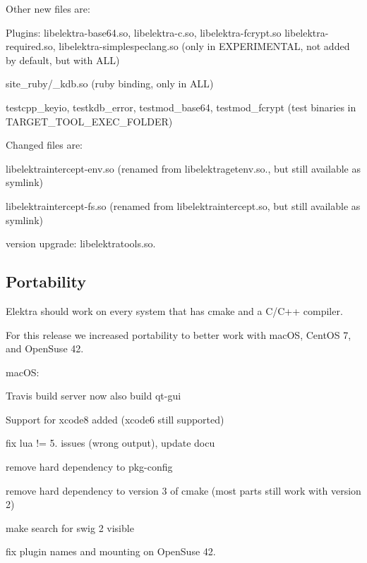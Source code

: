 Other new files are\+:


\begin{DoxyItemize}
\item Plugins\+: {\ttfamily libelektra-\/base64.\+so}, {\ttfamily libelektra-\/c.\+so}, {\ttfamily libelektra-\/fcrypt.\+so} {\ttfamily libelektra-\/required.\+so}, {\ttfamily libelektra-\/simplespeclang.\+so} (only in {\ttfamily E\+X\+P\+E\+R\+I\+M\+E\+N\+T\+AL}, not added by default, but with {\ttfamily A\+LL})
\item {\ttfamily site\+\_\+ruby/\+\_\+kdb.\+so} (ruby binding, only in {\ttfamily A\+LL})
\item {\ttfamily testcpp\+\_\+keyio}, {\ttfamily testkdb\+\_\+error}, {\ttfamily testmod\+\_\+base64}, {\ttfamily testmod\+\_\+fcrypt} (test binaries in {\ttfamily T\+A\+R\+G\+E\+T\+\_\+\+T\+O\+O\+L\+\_\+\+E\+X\+E\+C\+\_\+\+F\+O\+L\+D\+ER})
\end{DoxyItemize}

Changed files are\+:


\begin{DoxyItemize}
\item {\ttfamily libelektraintercept-\/env.\+so} (renamed from {\ttfamily libelektragetenv.\+so.}, but still available as symlink)
\item {\ttfamily libelektraintercept-\/fs.\+so} (renamed from {\ttfamily libelektraintercept.\+so}, but still available as symlink)
\item version upgrade\+: {\ttfamily libelektratools.\+so.}
\end{DoxyItemize}

\subsection*{Portability}

Elektra should work on every system that has {\ttfamily cmake} and a {\ttfamily C/\+C++} compiler.

For this release we increased portability to better work with mac\+OS, Cent\+OS 7, and Open\+Suse 42.


\begin{DoxyItemize}
\item mac\+OS\+:
\begin{DoxyItemize}
\item Travis build server now also build qt-\/gui
\item Support for xcode8 added (xcode6 still supported)
\end{DoxyItemize}
\item fix lua != 5. issues (wrong output), update docu
\item remove hard dependency to {\ttfamily pkg-\/config}
\item remove hard dependency to version 3 of {\ttfamily cmake} (most parts still work with version 2)
\item make search for swig 2 visible
\item fix plugin names and mounting on Open\+Suse 42.
\end{DoxyItemize}

